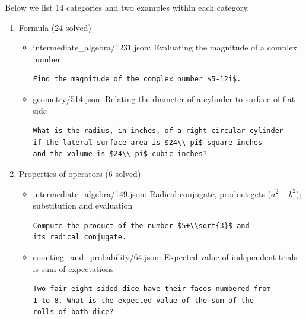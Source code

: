 \documentclass[11pt,a4paper]{article}
\begin{document}
Below we list 14 categories and two examples within each category.
\begin{enumerate}
  \item Formula (24 solved)
    \begin{itemize}
      \item intermediate\_algebra/1231.json: Evaluating the magnitude of a complex number
\begin{verbatim}
Find the magnitude of the complex number $5-12i$.
\end{verbatim}

    \item geometry/514.json: Relating the diameter of a cylinder to surface of flat side
\begin{verbatim}
What is the radius, in inches, of a right circular cylinder
if the lateral surface area is $24\\ pi$ square inches
and the volume is $24\\ pi$ cubic inches?
\end{verbatim}
    \end{itemize}

  \item Properties of operators (6 solved)
    \begin{itemize}
      \item intermediate\_algebra/149.json: Radical conjugate, product gets ($a^2-b^2$); substitution and evaluation
\begin{verbatim}
Compute the product of the number $5+\\sqrt{3}$ and
its radical conjugate.
\end{verbatim}
      \item counting\_and\_probability/64.json: Expected value of independent trials is sum of expectations
\begin{verbatim}
Two fair eight-sided dice have their faces numbered from
1 to 8. What is the expected value of the sum of the
rolls of both dice?
\end{verbatim}
    \end{itemize}


\end{enumerate}
\end{document}
